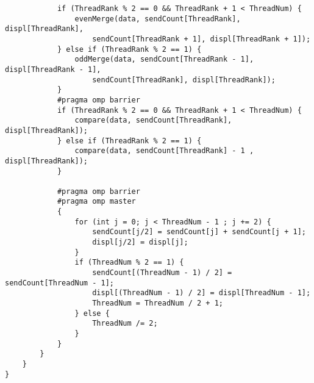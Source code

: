\documentclass{report}
\begin{document}
\begin{lstlisting}
            if (ThreadRank % 2 == 0 && ThreadRank + 1 < ThreadNum) {
                evenMerge(data, sendCount[ThreadRank], displ[ThreadRank],
                    sendCount[ThreadRank + 1], displ[ThreadRank + 1]);
            } else if (ThreadRank % 2 == 1) {
                oddMerge(data, sendCount[ThreadRank - 1], displ[ThreadRank - 1],
                    sendCount[ThreadRank], displ[ThreadRank]);
            }
            #pragma omp barrier
            if (ThreadRank % 2 == 0 && ThreadRank + 1 < ThreadNum) {
                compare(data, sendCount[ThreadRank], displ[ThreadRank]);
            } else if (ThreadRank % 2 == 1) {
                compare(data, sendCount[ThreadRank] - 1 , displ[ThreadRank]);
            }

            #pragma omp barrier
            #pragma omp master
            {
                for (int j = 0; j < ThreadNum - 1 ; j += 2) {
                    sendCount[j/2] = sendCount[j] + sendCount[j + 1];
                    displ[j/2] = displ[j];
                }
                if (ThreadNum % 2 == 1) {
                    sendCount[(ThreadNum - 1) / 2] = sendCount[ThreadNum - 1];
                    displ[(ThreadNum - 1) / 2] = displ[ThreadNum - 1];
                    ThreadNum = ThreadNum / 2 + 1;
                } else {
                    ThreadNum /= 2;
                }
            }
        }
    }
}

\end{lstlisting}
\end{document}
